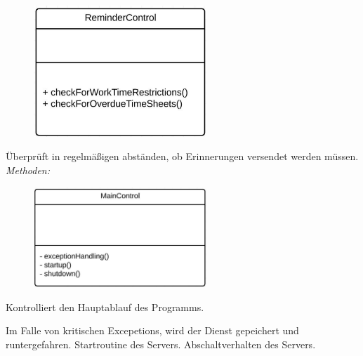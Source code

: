\begin{itemize}
\begin{itemize}
                    \newpage
                    \begin{figure}[htb]
                    \centering
                    \includegraphics[width=6.5cm]{Diagramms/class/singleclass/ControlRem.pdf}
                    \end{figure}
                        Überprüft in regelmäßigen abständen, ob Erinnerungen versendet werden müssen.
                        \emph{Methoden:}
                        \begin{itemize}
                        \end{itemize}

                    
                    \begin{figure}[htb]
                    \centering
                    \includegraphics[width=6.5cm]{Diagramms/class/singleclass/ControlMain.pdf}
                    \end{figure}
                        Kontrolliert den Hauptablauf des Programms.
                        \begin{itemize}
                                Im Falle von kritischen Excepetions, wird der Dienst gepeichert und runtergefahren.
                                Startroutine des Servers.
                                Abschaltverhalten des Servers.
                        \end{itemize}


\end{itemize}
\end{itemize}
